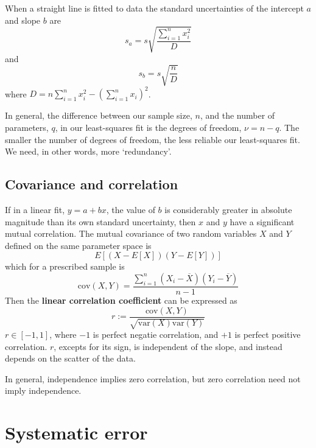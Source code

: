 When a straight line is fitted to data the standard uncertainties of the intercept $a$ and slope $b$ are
\begin{equation}
    s_a = s\sqrt{\frac{\sum_{i=1}^nx_i^2}{D}}
\end{equation}
and
\begin{equation}
    s_b = s\sqrt{\frac{n}{D}}
\end{equation}
where $D = n\sum_{i=1}^nx_i^2-\left(\sum_{i=1}^nx_i\right)^2$.


In general, the difference between our sample size, $n$, and the number of parameters, $q$, in our least-squares fit is the degrees of freedom, $\nu = n-q$. The smaller the number of degrees of freedom, the less reliable our least-squares fit. We need, in other words, more `redundancy'.

\subsection{Covariance and correlation}


If in a linear fit, $y = a+bx$, the value of $b$ is considerably greater in absolute magnitude than its own standard uncertainty, then $x$ and $y$ have a significant mutual correlation. The mutual covariance of two random variables $X$ and $Y$ defined on the same parameter space is
\begin{equation}
    E[(X-E[X])(Y-E[Y])]
\end{equation}
which for a prescribed sample is
\begin{equation}
    \text{cov}(X,Y) = \frac{\sum_{i=1}^n(X_i-\overline{X})(Y_i-\overline{Y})}{n-1}
\end{equation}
Then the \textbf{linear correlation coefficient} can be expressed as
\begin{equation}
    r := \frac{\text{cov}(X,Y)}{\sqrt{\text{var}(X)\text{var}(Y)}}
\end{equation}
$r \in [-1,1]$, where $-1$ is perfect negatie correlation, and $+1$ is perfect positive correlation. $r$, excepts for its sign, is independent of the slope, and instead depends on the scatter of the data.


In general, independence implies zero correlation, but zero correlation need not imply independence.


\section{Systematic error}
